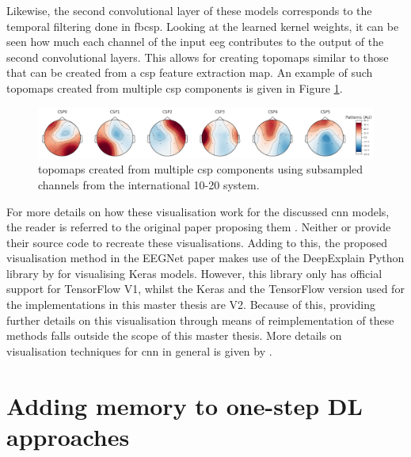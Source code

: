Likewise, the second convolutional layer of these models corresponds to the temporal filtering done in \gls{fbcsp}.
Looking at the learned kernel weights, it can be seen how much each channel of the input \gls{eeg} contributes to the output of the second convolutional layers.
This allows for creating \glspl{topomap} similar to those that can be created from a \gls{csp} feature extraction map.
An example of such \glspl{topomap} created from multiple \gls{csp} components is given in Figure \ref{fig:offline_bci_csp_visual}.

\begin{figure}[t]
    \centering
    \includegraphics[width=\linewidth]{../images/offline/csp_vis.pdf}
    \captionsetup{width=0.85\linewidth}
    \captionsetup{justification=centering}
    \caption{\glspl{topomap} created from multiple \gls{csp} components using subsampled channels from the international 10-20 system.}
    \label{fig:offline_bci_csp_visual}
\end{figure}

For more details on how these visualisation work for the discussed \gls{cnn} models, the reader is referred to the original paper proposing them \citep{eeg_model_eegnet,eeg_model_hbm}.
Neither \citet[][Authors of EEGNet ]{eeg_model_eegnet} or \citet[][Authors of DeepConvNet and ShallowConvNet ]{eeg_model_hbm} provide their source code to recreate these visualisations.
Adding to this, the proposed visualisation method in the EEGNet paper makes use of the DeepExplain Python library by \citep{deepexplain} for visualising Keras models.
However, this library only has official support for TensorFlow V1, whilst the Keras and the TensorFlow version used for the implementations in this master thesis are V2.
Because of this, providing further details on this visualisation through means of reimplementation of these methods falls outside the scope of this master thesis.
More details on visualisation techniques for \gls{cnn} in general is given by \citet{cnn_visualisations}.

\section{Adding memory to one-step DL approaches}
\label{sec:offline_bci_system_adding_memory}

